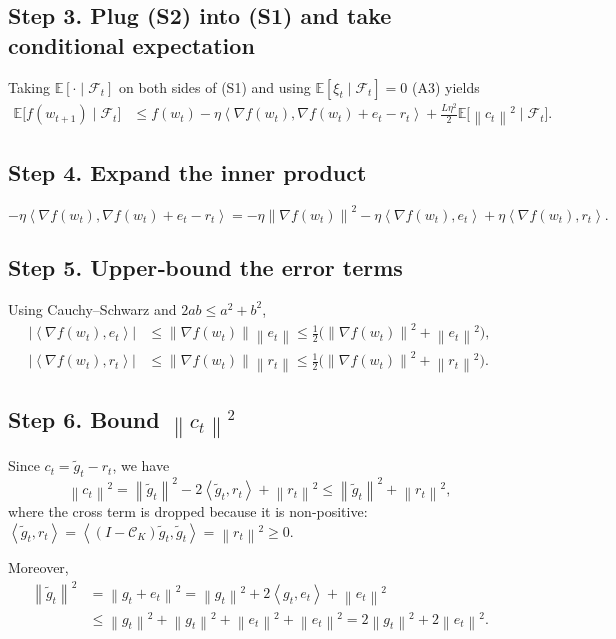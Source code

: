\documentclass{article}
\newcommand{\E}{\mathbb{E}}
\newcommand{\norm}[1]{\left\|#1\right\|}
\newcommand{\inner}[2]{\left\langle #1,#2\right\rangle}
\newcommand{\topk}{\mathcal{C}_K}
\begin{document}
\subsection*{Step 3. Plug (S2) into (S1) and take conditional expectation}
Taking $\E[\cdot\mid\mathcal{F}_t]$ on both sides of (S1) and using
$\E[\xi_t\mid\mathcal{F}_t]=0$ (A3) yields
\[
\begin{aligned}
\E\!\big[f(w_{t+1})\mid\mathcal{F}_t\big]
&\le f(w_t)-\eta\inner{\nabla f(w_t)}{\nabla f(w_t)+e_t-r_t}
   +\frac{L\eta^{2}}{2}\E\!\big[\norm{c_t}^{2}\mid\mathcal{F}_t\big] .
\end{aligned}
\tag{S3}
\]

\subsection*{Step 4. Expand the inner product}
\[
-\eta\inner{\nabla f(w_t)}{\nabla f(w_t)+e_t-r_t}
= -\eta\norm{\nabla f(w_t)}^{2}
  -\eta\inner{\nabla f(w_t)}{e_t}
  +\eta\inner{\nabla f(w_t)}{r_t}.
\tag{S4}
\]

\subsection*{Step 5. Upper‑bound the error terms}
Using Cauchy–Schwarz and $2ab\le a^{2}+b^{2}$,
\[
\begin{aligned}
\big|\inner{\nabla f(w_t)}{e_t}\big|
&\le \norm{\nabla f(w_t)}\norm{e_t}
 \le \tfrac12\big(\norm{\nabla f(w_t)}^{2}+\norm{e_t}^{2}\big),\\[2mm]
\big|\inner{\nabla f(w_t)}{r_t}\big|
&\le \norm{\nabla f(w_t)}\norm{r_t}
 \le \tfrac12\big(\norm{\nabla f(w_t)}^{2}+\norm{r_t}^{2}\big).
\end{aligned}
\tag{S5}
\]

\subsection*{Step 6. Bound $\norm{c_t}^{2}$}
Since $c_t = \tilde g_t - r_t$, we have
\[
\norm{c_t}^{2}
= \norm{\tilde g_t}^{2}
  -2\inner{\tilde g_t}{r_t}+\norm{r_t}^{2}
\le \norm{\tilde g_t}^{2}+\norm{r_t}^{2},
\tag{S6}
\]
where the cross term is dropped because it is non‑positive:
$\inner{\tilde g_t}{r_t}= \inner{(I-\topk)\tilde g_t}{\tilde g_t}
 = \norm{r_t}^{2}\ge0$.

Moreover,
\[
\begin{aligned}
\norm{\tilde g_t}^{2}
&= \norm{g_t+e_t}^{2}
 = \norm{g_t}^{2}+2\inner{g_t}{e_t}+\norm{e_t}^{2}\\
&\le \norm{g_t}^{2}+ \norm{g_t}^{2}+\norm{e_t}^{2}
   +\norm{e_t}^{2}
 = 2\norm{g_t}^{2}+2\norm{e_t}^{2}.
\end{aligned}
\tag{S7}
\]
\end{document}
